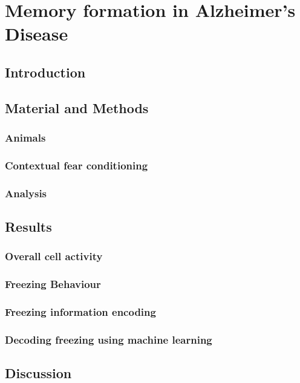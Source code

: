 \chapter{Memory formation in Alzheimer's Disease}
\section{Introduction}
\section{Material and Methods}
\subsection{Animals}
\subsection{Contextual fear conditioning}
\subsection{Analysis}
\section{Results}
\subsection{Overall cell activity}
\subsection{Freezing Behaviour}
\subsection{Freezing information encoding}
\subsection{Decoding freezing using machine learning}
\section{Discussion}
